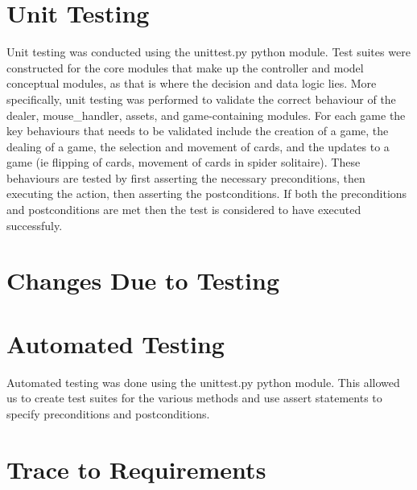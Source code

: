 \documentclass[12pt, titlepage]{article}
\begin{document}
\section{Unit Testing}

\indent \indent Unit testing was conducted using the unittest.py python module. 
Test 
suites
were constructed for the core modules that make up the controller and model
conceptual modules, as that is where the decision and data logic lies. More
specifically, unit testing was performed to validate the correct behaviour of
the dealer, mouse\_handler, assets, and game-containing modules. \newline
\indent For each game the key behaviours that needs to be validated include the
creation of a game, the dealing of a game, the selection and movement of
cards, and the updates to a game (ie flipping of cards, movement of cards in
spider solitaire). These behaviours are tested by first asserting the necessary
preconditions, then executing the action, then asserting the postconditions.
If both the preconditions and postconditions are met then the test is considered
to have executed successfuly.

\section{Changes Due to Testing}

\section{Automated Testing}

Automated testing was done using the unittest.py python module. This allowed us to create test suites for the various methods and use assert statements to specify preconditions and postconditions.
		
\section{Trace to Requirements}
\end{document}
